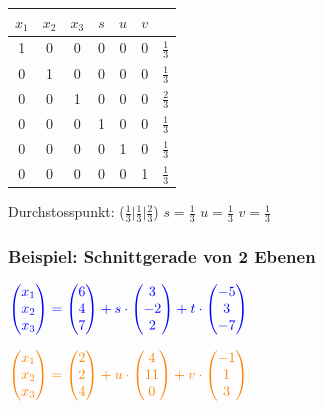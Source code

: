   		\begin{tabular}{| c c c c c c | c |}
		\hline
		$x_1$ & $x_2$ & $x_3$ & $s$ & $u$ & $v$ & \\
		\hline
		1 & 0 & 0 & 0 & 0 & 0 & $\frac{1}{3}$ \\
		0 & 1 & 0 & 0 & 0 & 0 & $\frac{1}{3}$ \\
		0 & 0 & 1 & 0 & 0 & 0 & $\frac{2}{3}$ \\
		0 & 0 & 0 & 1 & 0 & 0 & $\frac{1}{3}$ \\
		0 & 0 & 0 & 0 & 1 & 0 & $\frac{1}{3}$ \\
		0 & 0 & 0 & 0 & 0 & 1 & $\frac{1}{3}$\\
	    \hline
		\end{tabular}		
	
	\vspace{0.2cm}
	
		Durchstosspunkt: ($\frac{1}{3} \vert \frac{1}{3} \vert \frac{2}{3}$) \quad $s = \frac{1}{3}$ \quad $u = \frac{1}{3}$ \quad $v =  \frac{1}{3}$	
						
	
	
	
			\subsubsection{Beispiel: Schnittgerade von 2 Ebenen}		    					$\textcolor{blue}{\begin{pmatrix} x_1 \\ x_2 \\ x_3 \end{pmatrix} = \begin{pmatrix} 6 \\ 4 \\ 7 \end{pmatrix} + s \cdot \begin{pmatrix} 3 \\ -2 \\ 2\end{pmatrix} + t \cdot \begin{pmatrix} -5 \\ 3 \\ -7\end{pmatrix}}$ \\
			
			\vspace{0.2cm}
			
			 $\textcolor{orange}{\begin{pmatrix} x_1 \\ x_2 \\ x_3 \end{pmatrix} = \begin{pmatrix} 2 \\ 2 \\ 4 \end{pmatrix} + u \cdot \begin{pmatrix} 4 \\ 11 \\ 0\end{pmatrix} + v \cdot \begin{pmatrix} -1 \\ 1 \\ 3\end{pmatrix}}$ \\
		\\

